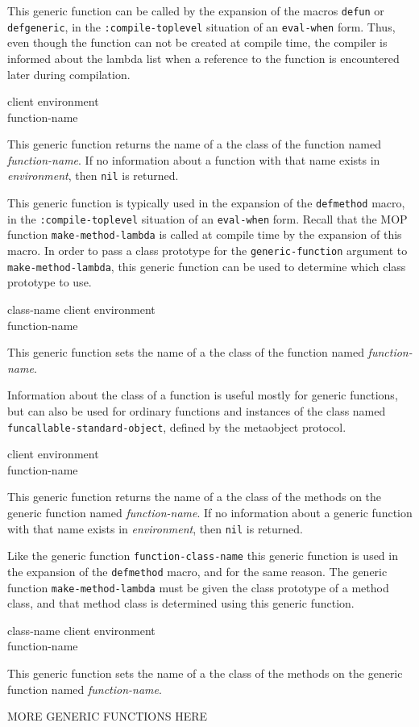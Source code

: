 This generic function can be called by the expansion of the macros
\texttt{defun} or \texttt{defgeneric}, in the
\texttt{:compile-toplevel} situation of an \texttt{eval-when} form.
Thus, even though the function can not be created at compile time, the
compiler is informed about the lambda list when a reference to the
function is encountered later during compilation.

 {client environment \\ function-name}

This generic function returns the name of a the class of the function
named \textit{function-name}.  If no information about a
function with that name exists in \textit{environment}, then
\texttt{nil} is returned.

This generic function is typically used in the expansion of the
\texttt{defmethod} macro, in the \texttt{:compile-toplevel} situation
of an \texttt{eval-when} form.  Recall that the MOP function
\texttt{make-method-lambda} is called at compile time by the expansion
of this macro.  In order to pass a class prototype for the
\texttt{generic-function} argument to \texttt{make-method-lambda},
this generic function can be used to determine which class prototype
to use.

 {class-name client environment \\
function-name}

This generic function sets the name of a the class of the function
named \textit{function-name}.

Information about the class of a function is useful mostly for generic
functions, but can also be used for ordinary functions and instances
of the class named \texttt{funcallable-standard-object}, defined by
the metaobject protocol.

 {client environment \\ function-name}

This generic function returns the name of a the class of the methods
on the generic function named \textit{function-name}.  If no information
about a generic function with that name exists in
\textit{environment}, then \texttt{nil} is returned.

Like the generic function \texttt{function-class-name} this generic
function is used in the expansion of the \texttt{defmethod} macro, and
for the same reason.  The generic function \texttt{make-method-lambda}
must be given the class prototype of a method class, and that method
class is determined using this generic function.

 {class-name client environment \\
function-name}

This generic function sets the name of a the class of the methods on
the generic function named \textit{function-name}.

MORE GENERIC FUNCTIONS HERE
